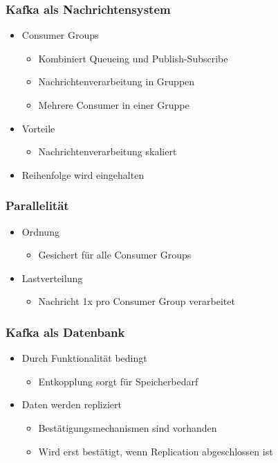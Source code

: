 \begin{frame}
\frametitle{Kafka als Nachrichtensystem}

\begin{itemize}
	\item Consumer Groups
	\begin{itemize}
		\item Kombiniert Queueing und Publish-Subscribe
		\item Nachrichtenverarbeitung in Gruppen
		\item Mehrere Consumer in einer Gruppe
	\end{itemize}
	\item Vorteile
	\begin{itemize}
		\item Nachrichtenverarbeitung skaliert %
	\end{itemize}
	\item Reihenfolge wird eingehalten 
\end{itemize}

\end{frame}

\begin{frame}
\frametitle{Parallelität}

\begin{itemize}
	\item Ordnung 
	\begin{itemize}
		\item Gesichert für alle Consumer Groups
	\end{itemize}
	\item Lastverteilung
		\begin{itemize}
		\item Nachricht 1x pro Consumer Group verarbeitet
	\end{itemize}
\end{itemize}

\end{frame}

\begin{frame}
\frametitle{Kafka als Datenbank}

\begin{itemize}
	\item Durch Funktionalität bedingt
	\begin{itemize}
		\item Entkopplung sorgt für Speicherbedarf
	\end{itemize}
	\item Daten werden repliziert
	\begin{itemize}
		\item Bestätigungsmechanismen sind vorhanden
		\item Wird erst bestätigt, wenn Replication abgeschlossen ist
	\end{itemize}
\end{itemize}

\end{frame}

